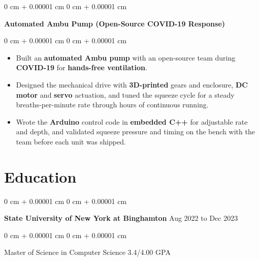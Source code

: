 \documentclass[10pt, letterpaper]{article}
\newenvironment{highlights}{
    \begin{itemize}[
        topsep=0.02 cm,
        parsep=0.02 cm,
        partopsep=0pt,
        itemsep=0pt,
        leftmargin=0 cm + 10pt
    ]
}{
    \end{itemize}
} %
\newenvironment{onecolentry}{
    \begin{adjustwidth}{
        0 cm + 0.00001 cm
    }{
        0 cm + 0.00001 cm
    }
}{
    \end{adjustwidth}
} %
\newcommand{\resumeheading}[2]{%
    \begin{onecolentry}
        #1 \hfill #2
    \end{onecolentry}
} %
\begin{document}
\vspace{0.04 cm}
\resumeheading{\textbf{Automated Ambu Pump (Open-Source COVID-19 Response)}}{}

\begin{onecolentry}
\begin{highlights}
	\item Built an \textbf{automated Ambu pump} with an open-source team during \textbf{COVID-19} for \textbf{hands-free ventilation}.
	\item Designed the mechanical drive with \textbf{3D-printed} gears and enclosure, \textbf{DC motor} and \textbf{servo} actuation, and tuned the squeeze cycle for a steady breaths-per-minute rate through hours of continuous running.
	\item Wrote the \textbf{Arduino} control code in \textbf{embedded C++} for adjustable rate and depth, and validated squeeze pressure and timing on the bench with the team before each unit was shipped.
\end{highlights}
\end{onecolentry}


\section{Education}

\resumeheading{\textbf{State University of New York at Binghamton}}{Aug 2022 to Dec 2023}

\begin{onecolentry}
	Master of Science in Computer Science \hfill 3.4/4.00 GPA
\end{onecolentry}
\end{document}
